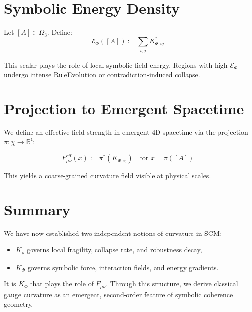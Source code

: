 \section{Symbolic Energy Density}

\begin{definition}
Let \( [A] \in \Omega_3 \). Define:
\[
\mathcal{E}_\Phi([A]) := \sum_{i,j} K_{\Phi, ij}^2
\]
\end{definition}

This scalar plays the role of local symbolic field energy. Regions with high \( \mathcal{E}_\Phi \) undergo intense RuleEvolution or contradiction-induced collapse.

\section{Projection to Emergent Spacetime}

We define an effective field strength in emergent 4D spacetime via the projection \( \pi: \chi \to \mathbb{R}^4 \):

\begin{equation}
F_{\mu\nu}^{\text{eff}}(x) := \pi^*(K_{\Phi, ij})
\quad \text{for } x = \pi([A])
\end{equation}

This yields a coarse-grained curvature field visible at physical scales.

\section{Summary}

We have now established two independent notions of curvature in SCM:

\begin{itemize}
  \item \( K_\rho \) governs local fragility, collapse rate, and robustness decay,
  \item \( K_\Phi \) governs symbolic force, interaction fields, and energy gradients.
\end{itemize}

It is \( K_\Phi \) that plays the role of \( F_{\mu\nu} \). Through this structure, we derive classical gauge curvature as an emergent, second-order feature of symbolic coherence geometry.
